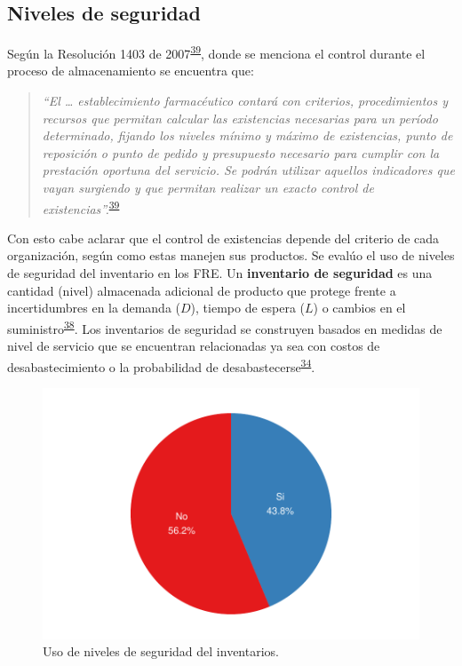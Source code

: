 \documentclass[
]{book}
\begin{document}
\hypertarget{niveles-de-seguridad}{%
\subsection{Niveles de seguridad}\label{niveles-de-seguridad}}

Según la Resolución 1403 de 2007\textsuperscript{\protect\hyperlink{ref-MinisteriodeSaludyProteccionSocial2007}{39}}, donde se menciona el control durante el proceso de almacenamiento se encuentra que:

\begin{quote}
\emph{``El \ldots{} establecimiento farmacéutico contará con criterios, procedimientos y recursos que permitan calcular las existencias necesarias para un período determinado, fijando los niveles mínimo y máximo de existencias, punto de reposición o punto de pedido y presupuesto necesario para cumplir con la prestación oportuna del servicio. Se podrán utilizar aquellos indicadores que vayan surgiendo y que permitan realizar un exacto control de existencias''.}\textsuperscript{\protect\hyperlink{ref-MinisteriodeSaludyProteccionSocial2007}{39}}
\end{quote}

Con esto cabe aclarar que el control de existencias depende del criterio de cada organización, según como estas manejen sus productos. Se evalúo el uso de niveles de seguridad del inventario en los FRE. Un \textbf{inventario de seguridad} es una cantidad (nivel) almacenada adicional de producto que protege frente a incertidumbres en la demanda (\(D\)), tiempo de espera (\(L\)) o cambios en el suministro\textsuperscript{\protect\hyperlink{ref-Krajewski2016}{38}}. Los inventarios de seguridad se construyen basados en medidas de nivel de servicio que se encuentran relacionadas ya sea con costos de desabastecimiento o la probabilidad de desabastecerse\textsuperscript{\protect\hyperlink{ref-Silver2017}{34}}.

\begin{figure}

{\centering \includegraphics[width=0.78\linewidth]{InformeFinal_files/figure-latex/UsoNivelesSeguridad-1} 

}

\caption{Uso de niveles de seguridad del inventarios.}\label{fig:UsoNivelesSeguridad}
\end{figure}
\end{document}

